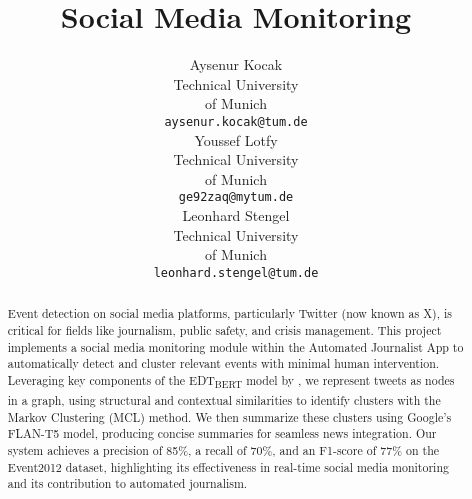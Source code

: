 \documentclass[11pt]{article}
\title{Social Media Monitoring}
\author{Aysenur Kocak \\
  Technical University \\ of Munich \\
  \texttt{aysenur.kocak@tum.de} \\\And
  Youssef Lotfy \\
  Technical University \\ of Munich \\
  \texttt{ge92zaq@mytum.de} \\\And
  Leonhard Stengel \\
  Technical University \\ of Munich \\
  \texttt{leonhard.stengel@tum.de} \\}
\begin{document}
\maketitle
\begin{abstract}
Event detection on social media platforms, particularly Twitter (now known as X), is critical for fields like journalism, public safety, and crisis management. This project implements a social media monitoring module within the Automated Journalist App to automatically detect and cluster relevant events with minimal human intervention. Leveraging key components of the EDT\textsubscript{BERT} model by \citet{edtbert}, we represent tweets as nodes in a graph, using structural and contextual similarities to identify clusters with the Markov Clustering (MCL) method. We then summarize these clusters using Google's FLAN-T5 model, producing concise summaries for seamless news integration. Our system achieves a precision of 85\%, a recall of 70\%, and an F1-score of 77\% on the Event2012 dataset, highlighting its effectiveness in real-time social media monitoring and its contribution to automated journalism.
\end{abstract}
















\end{document}
